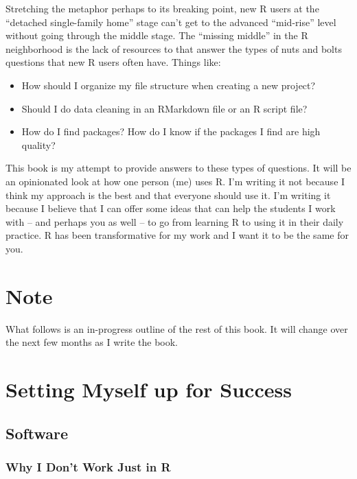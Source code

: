 \documentclass[]{book}
\providecommand{\tightlist}{%
  \setlength{\itemsep}{0pt}\setlength{\parskip}{0pt}}
\begin{document}
Stretching the metaphor perhaps to its breaking point, new R users at the ``detached single-family home'' stage can't get to the advanced ``mid-rise'' level without going through the middle stage. The ``missing middle'' in the R neighborhood is the lack of resources to that answer the types of nuts and bolts questions that new R users often have. Things like:

\begin{itemize}
\tightlist
\item
  How should I organize my file structure when creating a new project?
\item
  Should I do data cleaning in an RMarkdown file or an R script file?
\item
  How do I find packages? How do I know if the packages I find are high quality?
\end{itemize}

This book is my attempt to provide answers to these types of questions. It will be an opinionated look at how one person (me) uses R. I'm writing it not because I think my approach is the best and that everyone should use it. I'm writing it because I believe that I can offer some ideas that can help the students I work with -- and perhaps you as well -- to go from learning R to using it in their daily practice. R has been transformative for my work and I want it to be the same for you.

\hypertarget{note}{%
\chapter{Note}\label{note}}

What follows is an in-progress outline of the rest of this book. It will change over the next few months as I write the book.

\hypertarget{setting-myself-up-for-success}{%
\chapter{Setting Myself up for Success}\label{setting-myself-up-for-success}}

\hypertarget{software}{%
\section{Software}\label{software}}

\hypertarget{why-i-dont-work-just-in-r}{%
\subsection{Why I Don't Work Just in R}\label{why-i-dont-work-just-in-r}}
\end{document}

